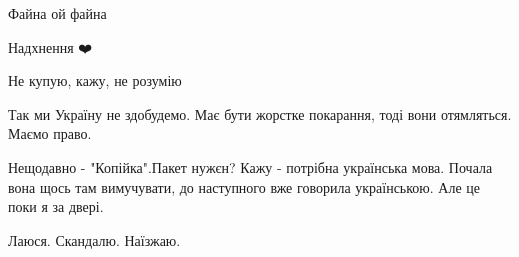 \begin{itemize}
 
Файна ой файна 🤩

 
Надхнення ❤️

 
Не купую, кажу, не розумію

 
Так ми Україну не здобудемо. Має бути жорстке покарання, тоді вони отямляться. Маємо право.

 
Нещодавно - "Копійка".Пакет нужєн? Кажу - потрібна українська мова. Почала вона
щось там вимучувати, до наступного вже говорила українською. Але це поки я за
двері.

 
Лаюся. Скандалю. Наїзжаю.

\begin{itemize}
 

\end{itemize}
\end{itemize}

